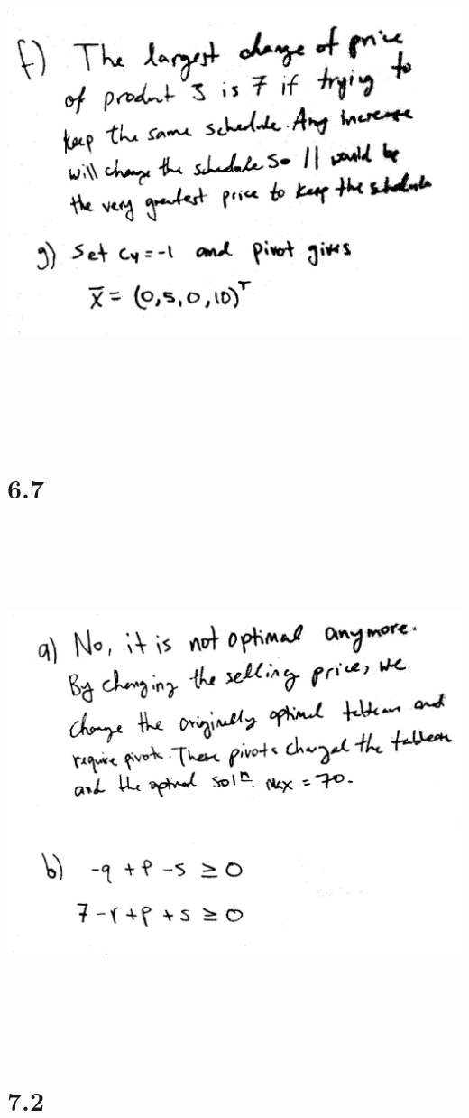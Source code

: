\documentclass[a4paper,12pt]{article}
\begin{document}
\begin{center}
\includegraphics[width=7in, height=6in, keepaspectratio=true]{image/sixfour2.jpg}
\end{center}
\pagebreak
\section*{6.7}
\includegraphics[width=7in, height=6in, keepaspectratio=true]{image/sixseven.jpg}
\pagebreak
\section*{7.2}
\end{document}
